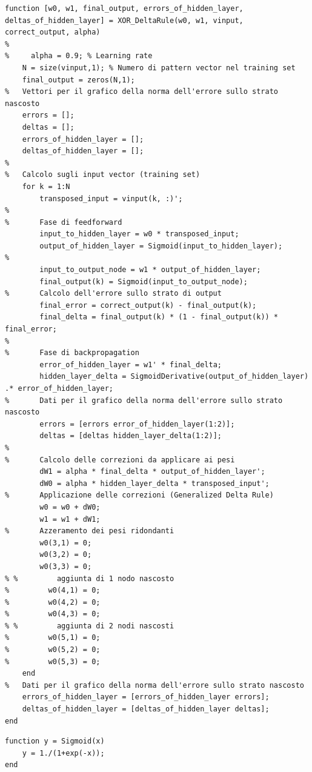 \documentclass[a4paper,12pt]{article}
\begin{document}
\newpage
\begin{lstlisting}[style=Matlab-editor,title=\texttt{XOR\_DeltaRule.mat}]
function [w0, w1, final_output, errors_of_hidden_layer, deltas_of_hidden_layer] = XOR_DeltaRule(w0, w1, vinput, correct_output, alpha)
%
%     alpha = 0.9; % Learning rate
    N = size(vinput,1); % Numero di pattern vector nel training set
    final_output = zeros(N,1);
%   Vettori per il grafico della norma dell'errore sullo strato nascosto
    errors = [];
    deltas = [];
    errors_of_hidden_layer = [];
    deltas_of_hidden_layer = [];
%
%   Calcolo sugli input vector (training set)
    for k = 1:N
        transposed_input = vinput(k, :)';
%
%       Fase di feedforward
        input_to_hidden_layer = w0 * transposed_input;
        output_of_hidden_layer = Sigmoid(input_to_hidden_layer);
%
        input_to_output_node = w1 * output_of_hidden_layer;
        final_output(k) = Sigmoid(input_to_output_node);
%       Calcolo dell'errore sullo strato di output
        final_error = correct_output(k) - final_output(k);
        final_delta = final_output(k) * (1 - final_output(k)) * final_error;
%
%       Fase di backpropagation
        error_of_hidden_layer = w1' * final_delta;
        hidden_layer_delta = SigmoidDerivative(output_of_hidden_layer) .* error_of_hidden_layer;
%       Dati per il grafico della norma dell'errore sullo strato nascosto
        errors = [errors error_of_hidden_layer(1:2)];
        deltas = [deltas hidden_layer_delta(1:2)];
%
%       Calcolo delle correzioni da applicare ai pesi
        dW1 = alpha * final_delta * output_of_hidden_layer';
        dW0 = alpha * hidden_layer_delta * transposed_input';
%       Applicazione delle correzioni (Generalized Delta Rule)
        w0 = w0 + dW0;
        w1 = w1 + dW1;
%       Azzeramento dei pesi ridondanti
        w0(3,1) = 0; 
        w0(3,2) = 0; 
        w0(3,3) = 0;
% %         aggiunta di 1 nodo nascosto
%         w0(4,1) = 0; 
%         w0(4,2) = 0; 
%         w0(4,3) = 0;
% %         aggiunta di 2 nodi nascosti
%         w0(5,1) = 0; 
%         w0(5,2) = 0; 
%         w0(5,3) = 0;
    end 
%   Dati per il grafico della norma dell'errore sullo strato nascosto
    errors_of_hidden_layer = [errors_of_hidden_layer errors];
    deltas_of_hidden_layer = [deltas_of_hidden_layer deltas];
end
\end{lstlisting}

\vspace{1cm}

\begin{lstlisting}[style=Matlab-editor,title=\texttt{Sigmoid.mat}]
function y = Sigmoid(x)
    y = 1./(1+exp(-x));
end
\end{lstlisting}
\end{document}
